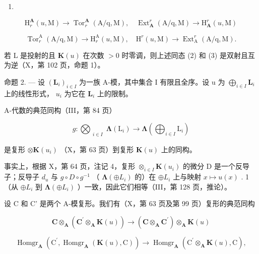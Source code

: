 \begin{enumerate}
\def\labelenumi{(\arabic{enumi})}
\setcounter{enumi}{1}
\tightlist
\item
\end{enumerate}

\[
\mathrm{H} _ {r} ^ {\mathbf {A}} (u, \mathrm{M}) \rightarrow \operatorname{Tor} _ {r} ^ {\mathbf {A}} (\mathrm{A} / \mathrm{q}, \mathrm{M}), \quad \operatorname{Ext} _ {\mathbf {A}} ^ {r} (\mathrm{A} / \mathrm{q}, \mathrm{M}) \rightarrow \mathrm{H} _ {\mathbf {A}} ^ {r} (u, \mathrm{M})\tag{3}
\]

\[
\operatorname{Tor} _ {r} ^ {\mathrm{A}} (\mathrm{A} / \mathrm{q}, \mathrm{M}) \rightarrow \mathrm{H} _ {r} ^ {\mathrm{A}} (u, \mathrm{M}), \quad \mathrm{H} ^ {r} (u, \mathrm{M}) \rightarrow \operatorname{Ext} _ {\mathrm{A}} ^ {r} (\mathrm{A} / \mathrm{q}, \mathrm{M}).
\]

若 L 是投射的且 \(\mathbf{K}(u)\) 在次数 \(>0\) 时零调，则上述同态 (2) 和 (3) 是双射且互为逆（X，第 102 页，命题 1）。

命题 2. --- 设 \((\mathbf{L}_{i})_{i\in I}\) 为一族 A-模，其中集合 I 有限且全序。设 u 为 \(\bigoplus_{i\in I}\mathbf{L}_{i}\) 上的线性形式， \(u_{i}\) 为它在 \(\mathbf{L}_{i}\) 上的限制。

A-代数的典范同构（III，第 84 页）

\[
g: \bigotimes_{\substack{i\in I}}\symbf{\Lambda}(\mathrm{L}_{i})\to \symbf{\Lambda}(\bigoplus_{i\in I}\mathrm{L}_{i})
\]

是复形 \(\otimes \mathbf{K}(u_i)\) （X，第 63 页）到复形 \(\mathbf{K}(u)\) 上的同构。

事实上，根据 X，第 64 页，注记 4，复形 \(\otimes_{i\in I}\mathbf{K}(u_i)\) 的微分 D 是一个反导子；反导子 \(d_u\) 与 \(g\circ D\circ g^{-1}\) （ \(\boldsymbol{\Lambda}(\oplus L_i)\) 的）在 \(\oplus L_i\) 上与映射 \(x\mapsto u(x)\) . 1（从 \(\oplus L_i\) 到 \(\boldsymbol{\Lambda}(\oplus L_i)\) ）一致，因此它们相等（III，第 128 页，推论）。

设 C 和 C' 是两个 A-模复形。我们有（X，第 63 页及第 99 页）复形的典范同构

\[
\mathbf {C} \otimes_ {\mathbf {A}} \left(\mathbf {C} ^ {\prime} \otimes_ {\mathbf {A}} \mathbf {K} (u)\right)\rightarrow \left(\mathbf {C} \otimes_ {\mathbf {A}} \mathbf {C} ^ {\prime}\right) \otimes_ {\mathbf {A}} \mathbf {K} (u)
\]

\[
\operatorname{Homgr} _ {\mathbf {A}} \left(\mathrm{C} ^ {\prime}, \operatorname{Homgr} _ {\mathbf {A}} (\mathbf {K} (u), \mathrm{C})\right)\rightarrow \operatorname{Homgr} _ {\mathbf {A}} \left(\mathrm{C} ^ {\prime} \otimes_ {\mathbf {A}} \mathbf {K} (u), \mathrm{C}\right),
\]


